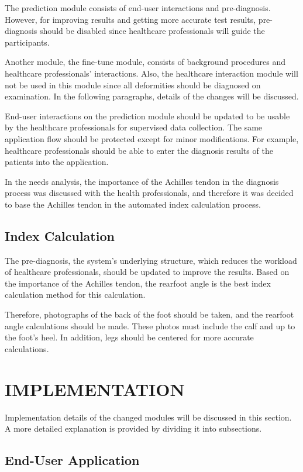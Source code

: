 The prediction module consists of end-user interactions and pre-diagnosis. However, for improving results and getting more accurate test results, pre-diagnosis should be disabled since healthcare professionals will guide the participants. 

Another module, the fine-tune module, consists of background procedures and healthcare professionals' interactions. Also, the healthcare interaction module will not be used in this module since all deformities should be diagnosed on examination. In the following paragraphs, details of the changes will be discussed.

End-user interactions on the prediction module should be updated to be usable by the healthcare professionals for supervised data collection. The same application flow should be protected except for minor modifications. For example, healthcare professionals should be able to enter the diagnosis results of the patients into the application.

In the needs analysis, the importance of the Achilles tendon in the diagnosis process was discussed with the health professionals, and therefore it was decided to base the Achilles tendon in the automated index calculation process.

\subsection{ Index Calculation }

The pre-diagnosis, the system's underlying structure, which reduces the workload of healthcare professionals, should be updated to improve the results. Based on the importance of the Achilles tendon, the rearfoot angle is the best index calculation method for this calculation. 

Therefore, photographs of the back of the foot should be taken, and the rearfoot angle calculations should be made. These photos must include the calf and up to the foot's heel. In addition, legs should be centered for more accurate calculations.

\section{IMPLEMENTATION}\label{sec:StudyIIImplementation}

Implementation details of the changed modules will be discussed in this section. A more detailed explanation is provided by dividing it into subsections. 

\subsection{End-User Application}

